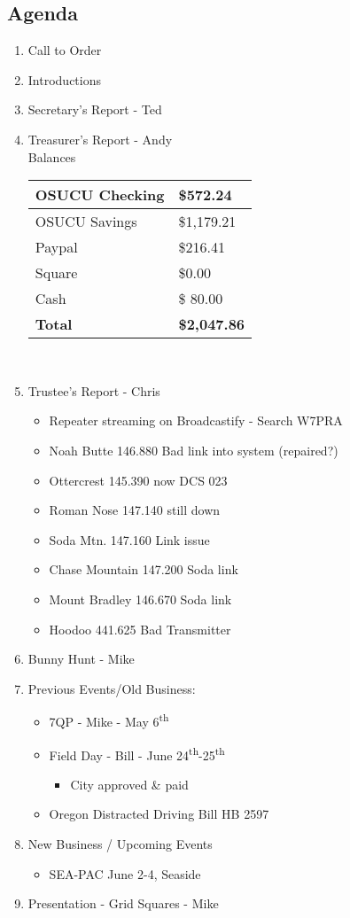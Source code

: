 	\subsection*{Agenda}
	\begin{enumerate}
		\item Call to Order
		\item Introductions
		\item Secretary's Report - Ted
		\item Treasurer's Report - Andy \\
				Balances \\
			\begin{tabular}{|l|l|} \hline
				OSUCU Checking & \$572.24 \\ \hline
				OSUCU Savings & \$1,179.21 \\ \hline
				Paypal & \$216.41 \\ \hline
				Square & \$0.00 \\ \hline
				Cash & \$ 80.00 \\ \hline
				\textbf{Total} & \textbf{\$2,047.86} \\ \hline
			\end{tabular} \\
		\item Trustee's Report - Chris
			\begin{itemize}
				\item Repeater streaming on Broadcastify - Search W7PRA
				\item Noah Butte 146.880 Bad link into system (repaired?)
				\item Ottercrest 145.390 now DCS 023
				\item Roman Nose 147.140 still down
				\item Soda Mtn. 147.160 Link issue
				\item Chase Mountain 147.200 Soda link
				\item Mount Bradley 146.670 Soda link
				\item Hoodoo 441.625 Bad Transmitter			
			\end{itemize}
		\item Bunny Hunt - Mike
		\item Previous Events/Old Business:
			\begin{itemize}
				\item 7QP - Mike - May 6\textsuperscript{th}
				\item Field Day - Bill - June 24\textsuperscript{th}-25\textsuperscript{th}
					\begin{itemize}
						\item City approved \& paid
					\end{itemize}
				\item Oregon Distracted Driving Bill HB 2597
			\end{itemize}
		\item  New Business / Upcoming Events
			\begin{itemize}
				\item SEA-PAC June 2-4, Seaside
			\end{itemize}
		\item  Presentation - Grid Squares - Mike
	\end{enumerate}

